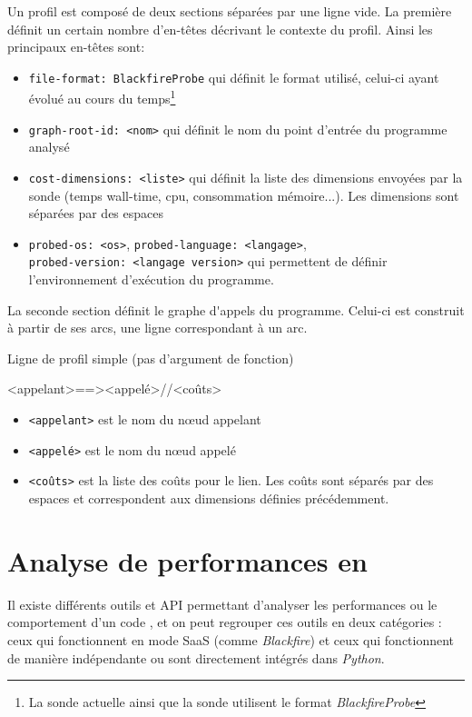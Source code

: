 Un profil est composé de deux sections séparées par une ligne vide. La première définit un certain nombre d'en-têtes décrivant le contexte du profil. Ainsi les principaux en-têtes sont:
\begin{itemize}
\item \verb|file-format: BlackfireProbe| qui définit le format utilisé, celui-ci ayant évolué au cours du temps\footnote{La sonde \PHP actuelle ainsi que la sonde \Python utilisent le format \emph{BlackfireProbe}}
\item \verb|graph-root-id: <nom>| qui définit le nom du point d'entrée du programme analysé
\item \verb|cost-dimensions: <liste>| qui définit la liste des dimensions envoyées par la sonde (temps wall-time, cpu, consommation mémoire...). Les dimensions sont séparées par des espaces
\item \verb|probed-os: <os>|, \verb|probed-language: <langage>|, \\\verb|probed-version: <langage version>| qui permettent de définir l'environnement d'exécution du programme.
\end{itemize}

La seconde section définit le \gls{graphe d'appels} du programme. Celui-ci est construit à partir de ses arcs, une ligne correspondant à un arc.

\begin{listing}[H]
\caption{Ligne de profil simple (pas d'argument de fonction)}
\begin{textcode}
<appelant>==><appelé>//<coûts>
\end{textcode}
\end{listing}

\begin{itemize}
\item \verb|<appelant>| est le nom du nœud appelant
\item \verb|<appelé>| est le nom du nœud appelé
\item \verb|<coûts>| est la liste des coûts pour le lien. Les coûts sont séparés par des espaces et correspondent aux dimensions définies précédemment.
\end{itemize}

	\chapter[Analyse en \Python]{Analyse de performances en \Python}
Il existe différents outils et API permettant d'analyser les performances ou le comportement d'un code \Python, et on peut regrouper ces outils en deux catégories : ceux qui fonctionnent en mode \gls{SaaS} (comme \emph{Blackfire}) et ceux qui fonctionnent de manière indépendante ou sont directement intégrés dans \emph{Python}.

